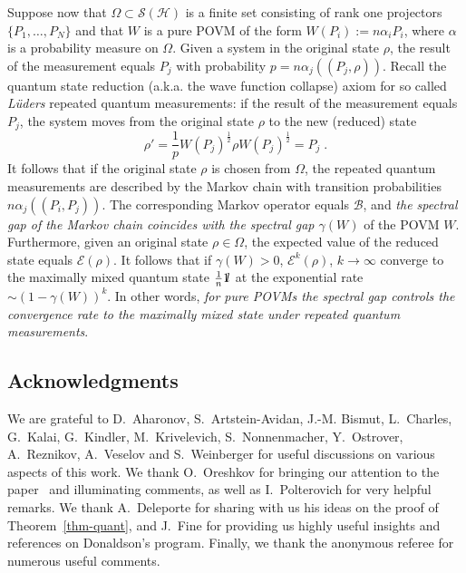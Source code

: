 \documentclass[11pt]{article}
\theoremstyle{definition}
\numberwithin{equation}{section}
\numberwithin{figure}{section}
\numberwithin{table}{section}
\newcommand{\cB}{{\mathcal{B}}}
\newcommand{\cE}{{\mathcal{E}}}
\newcommand{\cS}{{\mathcal{S}}}
\newcommand*\id{{1\hskip-2.5pt{\rm l}}}
\newcommand{\Hilb}{\mathcal{H}}
\newcommand\< {\mathcal{h}}
\renewcommand\> {\mathcal{i}}
\begin{document}

Suppose now that $\Omega \subset \cS(\Hilb)$ is a finite set consisting of rank one projectors $\{P_1,\dots, P_N\}$ and that $W$ is a pure POVM of the form $W(P_i) := n\alpha_i P_i$, where $\alpha$ is a probability measure on $\Omega$. Given a system in the original state $\rho$, the result of the measurement equals $P_j$ with probability $p= n\alpha_j((P_j,\rho))$. Recall the quantum state reduction (a.k.a. the wave function collapse) axiom for so called \emph{Lüders} repeated quantum measurements: if the result of the measurement equals $P_j$, the system moves from the original state $\rho$ to the new (reduced) state
\[
\rho' = \frac{1}{p} W(P_j)^{\frac{1}{2}}\rho W(P_j)^{\frac{1}{2}}= P_j\;.
\]
It follows that if the original state $\rho$ is chosen from $\Omega$, the repeated quantum measurements are described by the Markov chain with transition probabilities $n\alpha_j((P_i,P_j))$. The corresponding Markov operator equals $\cB$, and \emph{the spectral gap of the Markov chain coincides with the spectral gap $\gamma(W)$} of the POVM $W$. Furthermore, given an original state $\rho \in \Omega$, the expected value of the reduced state equals $\cE(\rho)$. It follows that if $\gamma(W)>0$, $\cE^k(\rho)$, $k \to \infty$ converge to the maximally mixed quantum state $\frac{1}{n}\id$ at the exponential rate $\sim (1-\gamma(W))^k$. In other words, \emph{for pure POVMs the spectral gap controls the convergence rate to the maximally mixed state under repeated quantum measurements}.



\subsection*{Acknowledgments}
We are grateful to D.~Aharonov, S.~Artstein-Avidan, J.-M. Bismut, L.~Charles, G.~Kalai, G.~Kindler, M.~Krivelevich, S.~Nonnenmacher, Y.~Ostrover, A.~Reznikov, A.~Veselov and S.~Weinberger for useful discussions on various aspects of this work. We thank O.~Oreshkov for bringing our attention to the paper~\cite{OC} and illuminating comments, as well as I.~Polterovich for very helpful remarks. We thank A.~Deleporte for sharing with us his ideas on the proof of Theorem~\ref{thm-quant}, and J.~Fine for providing us highly useful insights and references on Donaldson's program. Finally, we thank the anonymous referee for numerous useful comments.
\end{document}
